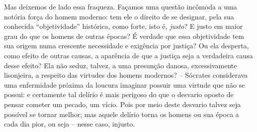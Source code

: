 Mas deixemos de lado essa fraqueza. Façamos uma questão incômoda a uma
notória força do homem moderno: tem ele o direito de se designar, pela
sua conhecida ``objetividade'' histórica, como forte, isto é,
\emph{justo}? E justo em maior grau do que os homens de outras épocas? É
verdade que essa objetividade tem sua origem numa crescente necessidade
e exigência por justiça? Ou ela desperta, como efeito de outras causas,
a aparência de que a justiça seja a verdadeira causa desse efeito? Ela
não seduz, talvez, a uma presunção danosa, excessivamente lisonjeira, a
respeito das virtudes dos homens modernos? -- Sócrates considerava uma
enfermidade próxima da loucura imaginar possuir uma virtude que não se
possui: e certamente tal delírio é mais perigoso do que o desvario
oposto de pensar cometer um pecado, um vício. Pois por meio deste
desvario talvez seja possível se tornar melhor; mas aquele delírio torna
os homens ou sua época a cada dia pior, ou seja -- nesse caso, injusto.

